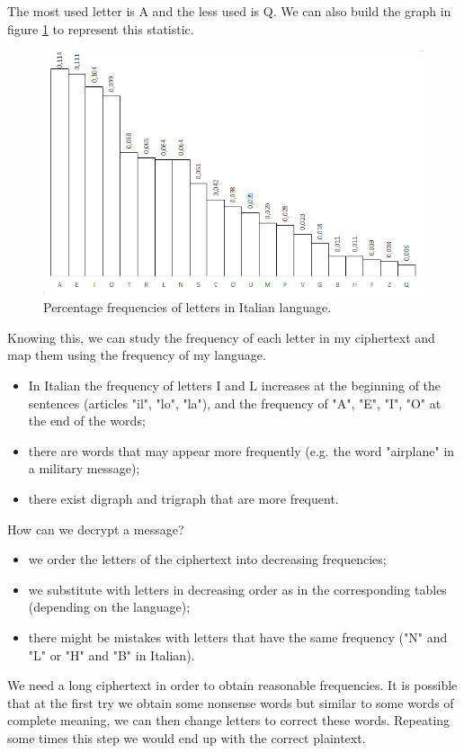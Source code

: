 \documentclass[a4paper, 12pt]{report}
\begin{document}
The most used letter is A and the less used is Q. We can also build the graph in figure \ref{fig:itastatsgraph} to represent this statistic.
\begin{figure}[H]
	\centering
	\includegraphics[scale=0.7]{images/Lec2/itastatsgraph.png}
	\caption{Percentage frequencies of letters in Italian language.}
	\label{fig:itastatsgraph}
\end{figure}
Knowing this, we can study the frequency of each letter in my ciphertext and map them using the frequency of my language.
\begin{itemize}
	\item In Italian the frequency of letters I and L increases at the beginning of the sentences (articles "il", "lo", "la"), and the frequency of "A", "E", "I", "O" at the end of the words;
	\item there are words that may appear more frequently (e.g. the word "airplane" in a  military message);
	\item there exist digraph and trigraph that are more frequent. 
\end{itemize}

How can we decrypt a message?
\begin{itemize}
	\item we order the letters of the ciphertext into decreasing frequencies;
	\item we substitute with letters in decreasing order as in the corresponding tables (depending on the language);
	\item there might be mistakes with letters that have the same frequency ("N" and "L" or "H" and "B" in Italian).
\end{itemize}

We need a long ciphertext in order to obtain reasonable frequencies.
It is possible that at the first try we obtain some nonsense words but similar to some words of complete meaning, we can then change letters to correct these words. Repeating some times this step we would end up with the correct plaintext.
\end{document}
